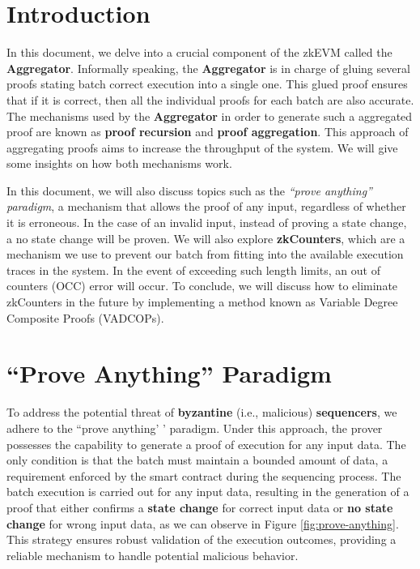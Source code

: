 


\section{Introduction}


In this document, we delve into a crucial component of the zkEVM called the
\textbf{Aggregator}. Informally speaking, the \textbf{Aggregator} is in charge of gluing several proofs stating batch correct execution into a single one. This glued proof ensures that if it is correct, then all the individual proofs for each batch are also accurate. The mechanisms used by the \textbf{Aggregator} in order to generate such a aggregated proof are known as \textbf{proof recursion} and \textbf{proof aggregation}. This approach of aggregating proofs aims to increase the throughput of the system. We will give some insights on how both mechanisms work.

In this document, we will also discuss topics such as the \textit{``prove anything'' paradigm}, a mechanism that allows the proof of any input, regardless of whether it is erroneous. In the case of an invalid input, instead of proving a state change, a no state change will be proven. We will also explore \textbf{zkCounters}, which are a mechanism we use to prevent our batch from fitting into the available execution traces in the system. In the event of exceeding such length limits, an out of counters (OCC) error will occur. To conclude, we will discuss how to eliminate zkCounters in the future by implementing a method known as Variable Degree Composite
Proofs (VADCOPs).





\section{``Prove Anything'' Paradigm}

To address the potential threat of \textbf{byzantine} (i.e., malicious) \textbf{sequencers}, we adhere to the ``prove anything' ' paradigm. Under this approach, the prover possesses the capability to generate a proof of execution for any input data. The only condition is that the batch must maintain a bounded amount of data, a requirement enforced by the smart contract during the sequencing process. The batch execution is carried out for any input data, resulting in the generation of a proof that either confirms a \textbf{state change} for correct input data or \textbf{no state change} for wrong input data, as we can observe in Figure \ref{fig:prove-anything}. This strategy ensures robust validation of the execution outcomes, providing a reliable mechanism to handle potential malicious behavior.

